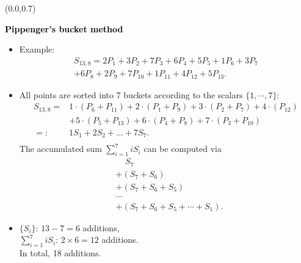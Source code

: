 \documentclass{beamer}                  %
\newcommand{\UW}[1]{\textbf{\textcolor{black}{#1}}}
\newcommand{\UWtitle}[1]{
	\begin{textblock}{12.8}(0.0,0.7)
		\begin{center} 
			\textbf{\UW{\Large{#1}}}
		\end{center}
	\end{textblock}
}
\newcommand{\fillframe}{\vspace*{10cm}}
\begin{document}
\begin{frame}
	\UWtitle{Pippenger's bucket method}
	\vspace*{0.8cm}
	\begin{small}
			\begin{itemize}	
				\item<1-> Example:
				\begin{eqnarray*}
				S_{13,8}=2 P_{1}+3 P_{2}+7 P_{3}+6 P_{4}+5 P_{5}+1 P_{6}+3 P_{7}\\
				+6 P_{8}+2 P_{9}+7 P_{10}+1 P_{11}+4 P_{12}+5 P_{13}.
				\end{eqnarray*}
				
				\item<2-> All points are sorted into 7 buckets according to the scalars $\{1, \cdots, 7\}$:
				\begin{equation*}
				\begin{aligned}
				S_{13,8}=& 1 \cdot\left(P_{6}+P_{11}\right)+2 \cdot\left(P_{1}+P_{9}\right)+3 \cdot\left(P_{2}+P_{7}\right)+4 \cdot\left(P_{12}\right) \\
				&+5 \cdot\left(P_{5}+P_{13}\right)+6 \cdot\left(P_{4}+P_{8}\right)+7 \cdot\left(P_{3}+P_{10}\right) \\
				=:& 1 S_{1}+2 S_{2}+\ldots+7 S_{7}.\\
				\end{aligned}
				\end{equation*}					
				\only<3> {The accumulated sum $\sum_{i=1}^{7}iS_i$ can be computed via
				\begin{equation*}
				\begin{aligned}
				&\ \ \ \ \  S_7 \\
				&+ (S_7+S_6)\\
				&+ (S_7+S_6+S_5)\\
				&\cdots \\
				&+(S_7+S_6+S_5+\cdots +S_1).
				\end{aligned}
				\end{equation*}	}			
				
				\item<4-> $\{S_i\}$: $13 - 7 = 6$ additions,\\
				$\sum_{i = 1}^{7} iS_i$: $2\times 6 = 12$ additions. \\
				In total, 18 additions.	
			\end{itemize}
	\end{small}
	\fillframe
\end{frame}
\end{document}
